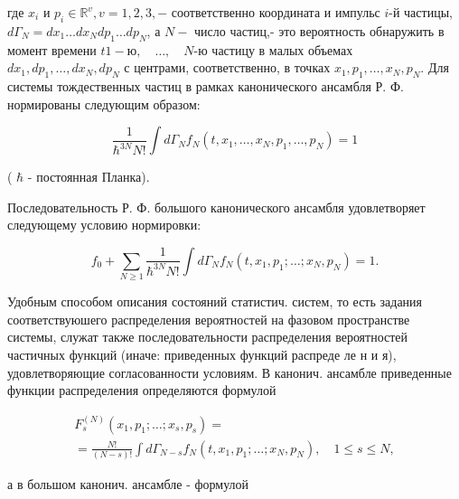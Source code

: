 \documentclass[10pt]{article}
\begin{document}
где $x_{i}$ и $p_{i} \in \mathbb{R}^{v}, v=1,2,3,-$ соответственно координата и импульс $i$-й частицы, $d \Gamma_{N}=d x_{1} \ldots d x_{N} d p_{1} \ldots d p_{N}$, а $N-$ число частиц,- это вероятность обнаружить в момент времени $t 1-ю, \quad \ldots, \quad N$-ю частицу в малых объемах $d x_{1}, d p_{1}, \ldots, d x_{N}, d p_{N}$ с центрами, соответственно, в точках $x_{1}, p_{1}, \ldots, x_{N}, p_{N}$. Для системы тождественных частиц в рамках канонического ансамбля Р. Ф. нормированы следующим образом:



\[

\frac{1}{\hbar^{3 N} N !} \int d \Gamma_{N} f_{N}\left(t, x_{1}, \ldots, x_{N}, p_{1}, \ldots, p_{N}\right)=1

\]



( $\hbar$ - постоянная Планка).



Последовательность Р. Ф. большого канонического ансамбля удовлетворяет следующему условию нормировки:



\[

f_{0}+\sum_{N \geqslant 1} \frac{1}{\hbar^{3 N} N !} \int d \Gamma_{N} f_{N}\left(t, x_{1}, p_{1} ; \ldots ; x_{N}, p_{N}\right)=1 .

\]



Удобным способом описания состояний статистич. систем, то есть задания соответствуюшего распределения вероятностей на фазовом пространстве системы, служат также последовательности распределения вероятностей частичных функций (иначе: приведенных функций распреде ле н и я), удовлетворяющие согласованности условиям. В канонич. ансамбле приведенные функции распределения определяются формулой



\[

\begin{gathered}

F_{s}^{(N)}\left(x_{1}, p_{1} ; \ldots ; x_{s}, p_{s}\right)= \\

=\frac{N !}{(N-s) !} \int d \Gamma_{N-s} f_{N}\left(t, x_{1}, p_{1} ; \ldots ; x_{N}, p_{N}\right), \quad 1 \leqslant s \leqslant N,

\end{gathered}

\]



а в большом канонич. ансамбле - формулой
\end{document}
